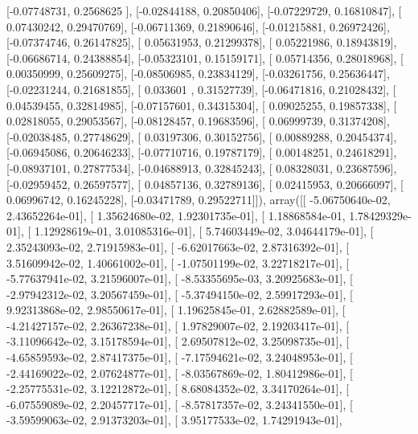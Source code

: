 \documentclass{article}
\begin{document}
       [-0.07748731,  0.2568625 ],
       [-0.02844188,  0.20850406],
       [-0.07229729,  0.16810847],
       [ 0.07430242,  0.29470769],
       [-0.06711369,  0.21890646],
       [-0.01215881,  0.26972426],
       [-0.07374746,  0.26147825],
       [ 0.05631953,  0.21299378],
       [ 0.05221986,  0.18943819],
       [-0.06686714,  0.24388854],
       [-0.05323101,  0.15159171],
       [ 0.05714356,  0.28018968],
       [ 0.00350999,  0.25609275],
       [-0.08506985,  0.23834129],
       [-0.03261756,  0.25636447],
       [-0.02231244,  0.21681855],
       [ 0.033601  ,  0.31527739],
       [-0.06471816,  0.21028432],
       [ 0.04539455,  0.32814985],
       [-0.07157601,  0.34315304],
       [ 0.09025255,  0.19857338],
       [ 0.02818055,  0.29053567],
       [-0.08128457,  0.19683596],
       [ 0.06999739,  0.31374208],
       [-0.02038485,  0.27748629],
       [ 0.03197306,  0.30152756],
       [ 0.00889288,  0.20454374],
       [-0.06945086,  0.20646233],
       [-0.07710716,  0.19787179],
       [ 0.00148251,  0.24618291],
       [-0.08937101,  0.27877534],
       [-0.04688913,  0.32845243],
       [ 0.08328031,  0.23687596],
       [-0.02959452,  0.26597577],
       [ 0.04857136,  0.32789136],
       [ 0.02415953,  0.20666097],
       [ 0.06996742,  0.16245228],
       [-0.03471789,  0.29522711]]), array([[ -5.06750640e-02,   2.43652264e-01],
       [  1.35624680e-02,   1.92301735e-01],
       [  1.18868584e-01,   1.78429329e-01],
       [  1.12928619e-01,   3.01085316e-01],
       [  5.74603449e-02,   3.04644179e-01],
       [  2.35243093e-02,   2.71915983e-01],
       [ -6.62017663e-02,   2.87316392e-01],
       [  3.51609942e-02,   1.40661002e-01],
       [ -1.07501199e-02,   3.22718217e-01],
       [ -5.77637941e-02,   3.21596007e-01],
       [ -8.53355695e-03,   3.20925683e-01],
       [ -2.97942312e-02,   3.20567459e-01],
       [ -5.37494150e-02,   2.59917293e-01],
       [  9.92313868e-02,   2.98550617e-01],
       [  1.19625845e-01,   2.62882589e-01],
       [ -4.21427157e-02,   2.26367238e-01],
       [  1.97829007e-02,   2.19203417e-01],
       [ -3.11096642e-02,   3.15178594e-01],
       [  2.69507812e-02,   3.25098735e-01],
       [ -4.65859593e-02,   2.87417375e-01],
       [ -7.17594621e-02,   3.24048953e-01],
       [ -2.44169022e-02,   2.07624877e-01],
       [ -8.03567869e-02,   1.80412986e-01],
       [ -2.25775531e-02,   3.12212872e-01],
       [  8.68084352e-02,   3.34170264e-01],
       [ -6.07559089e-02,   2.20457717e-01],
       [ -8.57817357e-02,   3.24341550e-01],
       [ -3.59599063e-02,   2.91373203e-01],
       [  3.95177533e-02,   1.74291943e-01],
\end{document}
